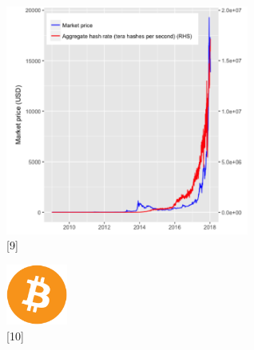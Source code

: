 \documentclass[letterpaper, 10 pt, conference]{ieeeconf}  %
\begin{document}
\begin{figure}[h!]
  \includegraphics[width=8cm]{market.PNG}
  \caption*{[9]}
\end{figure}
\begin{figure}[h!]
  \includegraphics[width=2cm]{bit.png}
  \caption*{[10]}
\end{figure}
\end{document}
